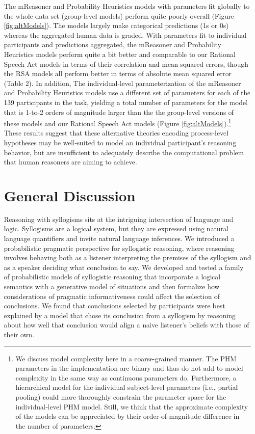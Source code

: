 \documentclass[floatsintext, man]{apa6}
\begin{document}
The mReasoner and Probability Heuristics models with parameters fit globally to the whole data set (group-level models) perform quite poorly overall (Figure \ref{fig:altModels}). 
The models largely make categorical predictions (1s or 0s) whereas the aggregated human data is graded.
With parameters fit to individual participants and predictions aggregated, the mReasoner and Probability Heuristics models perform quite a bit better and comparable to our Rational Speech Act models in terms of their correlation and mean squared errors, though the RSA models all perform better in terms of absolute mean squared error (Table 2).
In addition, The individual-level parameterization of the mReasoner and Probability Heuristics models use a different set of parameters for each of the 139 participants in the task, yielding a total number of parameters for the model that is 1-to-2 orders of magnitude larger than the the group-level versions of these models and our Rational Speech Act models (Figure \ref{fig:altModels}).\footnote{We discuss model complexity here in a coarse-grained manner. The PHM parameters in the  implementation are binary and thus do not add to model complexity in the same way as continuous parameters do. Furthermore, a hierarchical model for the individual subject-level parameters (i.e., partial pooling) could more thoroughly constrain the parameter space for the individual-level PHM model.
Still, we think that the approximate complexity of the models can be appreciated by their order-of-magnitude difference in the number of parameters.}
These results suggest that these alternative theories encoding process-level hypotheses may be well-suited to model an individual participant's reasoning behavior, but are insufficient to adequately describe the computational problem that human reasoners are aiming to achieve. 


\section{General Discussion}

Reasoning with syllogisms sits at the intriguing intersection of language and logic. 
Syllogisms are a logical system, but they are expressed using natural language quantifiers and invite natural language inferences. 
We introduced a probabilistic pragmatic perspective for syllogistic reasoning, where reasoning involves behaving both as a listener interpreting the premises of the syllogism and as a speaker deciding what conclusion to say.
We developed and tested a family of probabilistic models of syllogistic reasoning that incorporate a logical semantics with a generative model of situations and then formalize how considerations of pragmatic informativeness could affect the selection of conclusions.
We found that conclusions selected by participants were best explained by a model that chose its conclusion from a syllogism by reasoning about how well that conclusion would align a naive listener's beliefs with those of their own. 
\end{document}

